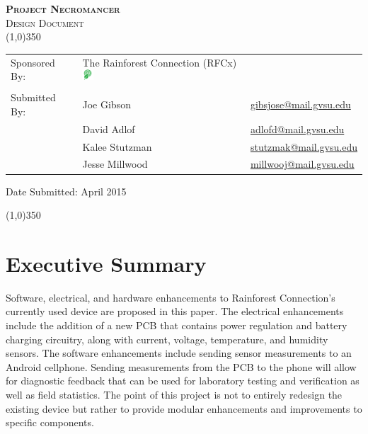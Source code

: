 \documentclass{article}
\newcommand{\ASSNMT}{Project Necromancer}
\newcommand{\CLASS}{Design Document}
\newcommand{\DATE}{April 2015}
\begin{document}
\begin{flushleft}

\textsc{\LARGE \bfseries \ASSNMT}\\

\textsc{\Large \CLASS}\\[0.2cm]
\linethickness{0.5mm}
{\color{ForestGreen}\line(1,0){350}} \\ [1.0cm]

\begin{flushleft} \large
\begin{tabular}{lll}
  Sponsored By: & The Rainforest Connection (RFCx) \includegraphics[height=0.4cm]{rfcxlogo} & \\
                &               & \\
  Submitted By: & Joe Gibson    & \href{mailto:gibsjose@mail.gvsu.edu}{gibsjose@mail.gvsu.edu}\\
              & David Adlof     & \href{mailto:adlofd@mail.gvsu.edu}{adlofd@mail.gvsu.edu}\\
              & Kalee Stutzman  & \href{mailto:stutzmak@mail.gvsu.edu}{stutzmak@mail.gvsu.edu}\\
              & Jesse Millwood  & \href{mailto:millwooj@mail.gvsu.edu}{millwooj@mail.gvsu.edu}\\
\end{tabular}

\bigskip

\bigskip
Date Submitted: \DATE
\end{flushleft}

\smallskip
{\color{ForestGreen}\line(1,0){350}} \\ [1.0cm]
\section*{Executive Summary}
Software, electrical, and hardware enhancements to Rainforest Connection’s currently used device are proposed in this paper. The electrical enhancements include the addition of a new PCB that contains power regulation and battery charging circuitry, along with current, voltage, temperature, and humidity sensors. The software enhancements include sending sensor measurements to an Android cellphone. Sending measurements from the PCB to the phone will allow for diagnostic feedback that can be used for laboratory testing and verification as well as field statistics. The point of this project is not to entirely redesign the existing device but rather to provide modular enhancements and improvements to specific components.


\end{flushleft}
\end{document}
